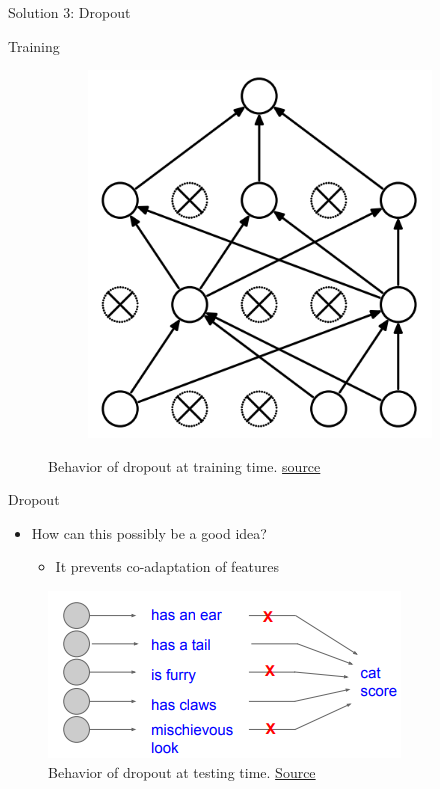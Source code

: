 \begin{frame}{Solution 3: Dropout}
\begin{block}{Training}
\begin{figure}[H]
\begin{subfigure}[b]{0.45\textwidth}
				\includegraphics[height=0.4\textheight]{Figs/Dropout-after.png}
			\end{subfigure}
			\caption{Behavior of dropout at training time. \href{https://www.cs.toronto.edu/~hinton/absps/JMLRdropout.pdf}{source}}
		\end{figure}
	\end{block}
\end{frame}
\begin{frame}{Dropout}
	\begin{itemize}
		\item How can this possibly be a good idea?
		\begin{itemize}
			\item It prevents co-adaptation of features
		\end{itemize}
	\end{itemize}
	\begin{figure}[H]
		\centering
		\includegraphics[height=0.4\textheight]{Figs/section_4/dropout_why.png}
		\caption{Behavior of dropout at testing time. \href{https://www.cs.toronto.edu/~hinton/absps/JMLRdropout.pdf}{Source}}
	\end{figure}
\end{frame}
